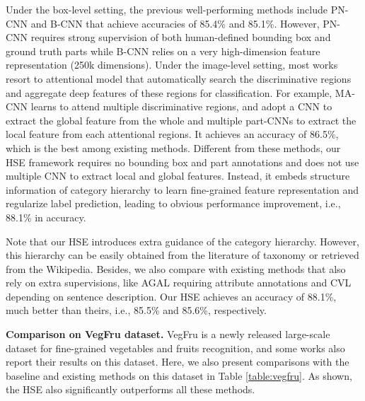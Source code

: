 \documentclass[sigconf]{acmart}
\begin{document}

Under the box-level setting, the previous well-performing methods include PN-CNN and B-CNN that achieve accuracies of 85.4\% and 85.1\%. However, PN-CNN requires strong supervision of both human-defined bounding box and ground truth parts while B-CNN relies on a very high-dimension feature representation (250k dimensions). Under the image-level setting, most works resort to attentional model that automatically search the discriminative regions and aggregate deep features of these regions for classification. For example, MA-CNN learns to attend multiple discriminative regions, and adopt a CNN to extract the global feature from the whole and multiple part-CNNs to extract the local feature from each attentional regions. It achieves an accuracy of 86.5\%, which is the best among existing methods. Different from these methods, our HSE framework requires no bounding box and part annotations and does not use multiple CNN to extract local and global features. Instead, it embeds structure information of category hierarchy to learn fine-grained feature representation and regularize label prediction, leading to obvious performance improvement, i.e., 88.1\% in accuracy. 

Note that our HSE introduces extra guidance of the category hierarchy. However, this hierarchy can be easily obtained from the literature of taxonomy or retrieved from the Wikipedia. Besides, we also compare with existing methods that also rely on extra supervisions, like AGAL requiring attribute annotations and CVL depending on sentence description. Our HSE achieves an accuracy of 88.1\%, much better than theirs, i.e., 85.5\% and 85.6\%, respectively.

\noindent\textbf{Comparison on VegFru dataset. }VegFru is a newly released large-scale dataset for fine-grained vegetables and fruits recognition, and some works also report their results on this dataset. Here, we also present comparisons with the baseline and existing methods on this dataset in Table \ref{table:vegfru}. As shown, the HSE also significantly outperforms all these methods.
\end{document}
